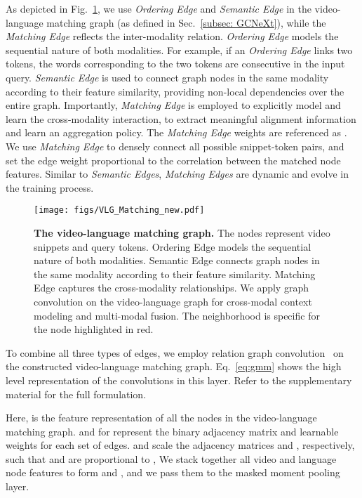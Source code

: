 \documentclass[10pt,twocolumn,letterpaper]{article}
\begin{document}
As depicted in Fig.~\ref{fig:gmn}, we use \textit{Ordering Edge} and \textit{Semantic Edge} in the video-language matching graph (as defined in Sec.~\ref{subsec: GCNeXt}), while the \textit{Matching Edge} reflects the inter-modality relation. 
\textit{Ordering Edge} models the sequential nature of both modalities. For example, if an \textit{Ordering Edge} links two tokens, the words corresponding to the two tokens are consecutive in the input query. 
\textit{Semantic Edge} is used to connect graph nodes in the same modality according to their feature similarity, providing non-local dependencies over the entire graph. 
Importantly, \textit{Matching Edge} is employed to explicitly model and learn the cross-modality interaction, to extract meaningful alignment information and learn an aggregation policy. 
The \textit{Matching Edge} weights are referenced as . We use \textit{Matching Edge} to densely connect all possible snippet-token pairs, and set the edge weight proportional to the correlation between the matched node features. 
Similar to \textit{Semantic Edges}, \textit{Matching Edges} are dynamic and evolve in the training process.

\begin{figure}[!t]
\centering
    \texttt{[image: figs/VLG\_Matching\_new.pdf]}
    \caption{\textbf{The video-language matching graph.} 
    The nodes represent video snippets and query tokens. 
    Ordering Edge models the sequential nature of both modalities.
    Semantic Edge connects graph nodes in the same modality according to their feature similarity.
    Matching Edge captures the cross-modality relationships.
    We apply graph convolution on the video-language graph for cross-modal context modeling and multi-modal fusion. The neighborhood is specific for the node highlighted in red. 
    } 
    \label{fig:gmn}
\end{figure}
To combine all three types of edges, we employ relation graph convolution~\cite{schlichtkrull2017modeling} on the constructed video-language matching graph. Eq.~\ref{eq:gmm} shows the high level representation of the convolutions in this layer. Refer to the supplementary material for the full formulation. 

Here,  is the feature representation of all the nodes in the video-language matching graph. 
 and  for  represent the binary adjacency matrix and learnable weights for each set of edges. 
 and  scale the adjacency matrices  and , respectively, such that  and  are proportional to ,
We stack together all video and language node features to form  and , and we pass them to the masked moment pooling layer.
\end{document}
